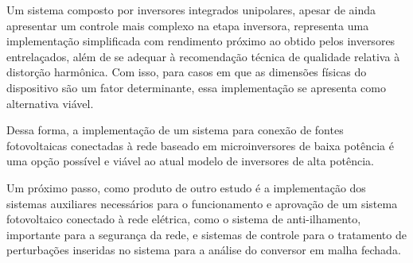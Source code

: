 \documentclass[
	12pt,				%
	openright,			%
	twoside,			%
	a4paper,			%
	english,			%
	french,				%
	spanish,			%
	brazil,				%
	]{abntex2}
\begin{document}
Um sistema composto por inversores integrados unipolares, apesar de ainda apresentar um controle mais complexo na etapa inversora, representa uma implementação simplificada com rendimento próximo ao obtido pelos inversores entrelaçados, além de se adequar à recomendação técnica de qualidade relativa à distorção harmônica. Com isso, para casos em que as dimensões físicas do dispositivo são um fator determinante, essa implementação se apresenta como alternativa viável.

Dessa forma, a implementação de um sistema para conexão de fontes fotovoltaicas conectadas à rede baseado em microinversores de baixa potência é uma opção possível e viável ao atual modelo de inversores de alta potência. 

Um próximo passo, como produto de outro estudo é a implementação dos sistemas auxiliares necessários para o funcionamento e aprovação de um sistema fotovoltaico conectado à rede elétrica, como o sistema de anti-ilhamento, importante para a segurança da rede, e sistemas de controle para o tratamento de perturbações inseridas no sistema para a análise do conversor em malha fechada.
% 

\postextual








\end{document}

